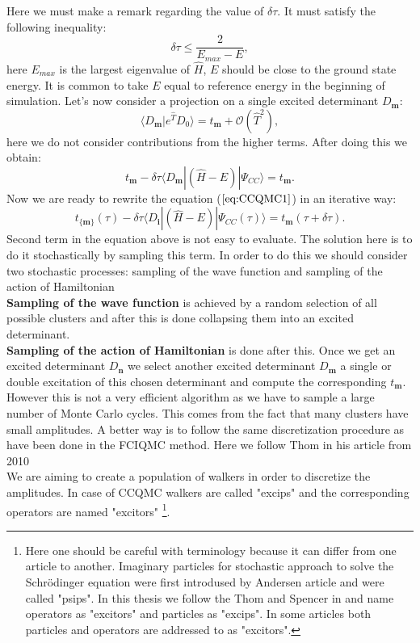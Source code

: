 \documentclass[twoside,english]{uiofysmaster}
\theoremstyle{definition}
\begin{document}
Here we must make a remark regarding the value of $\delta \tau$. It must satisfy the following inequality:
\begin{equation}
\delta \tau \leq \frac{2}{E_{max} - E},
\end{equation}
here $E_{max}$ is the largest eigenvalue of $\hat{H}$, $E$ should be close to the ground state energy. It is common to take $E$ equal to reference energy in the beginning of simulation.
Let's now consider a projection on a single excited determinant $D_{\boldsymbol{m}}$:
\begin{equation}
\langle D_{\boldsymbol{m}}|e^{\hat{T}}D_0\rangle = t_{\boldsymbol{m}} + \mathcal{O}(\hat{T}^2),
\end{equation}
here we  do not consider contributions from the higher terms. After doing this we obtain: 
\begin{equation}\label{CCbf2}
t_{\boldsymbol{m}} - \delta \tau \langle D_{\boldsymbol{m}}|(\hat{H}-E)|\Psi_{CC}\rangle = t_{\boldsymbol{m}}.
\end{equation}
Now we are ready to rewrite the equation ($\ref{eq:CCQMC1}$) in an iterative way:
\begin{equation}\label{eq:CCiter}
 t_{\{\boldsymbol{m}\}}(\tau) - \delta \tau \langle D_{\boldsymbol{i}}|(\hat{H}-E)|\Psi_{CC}(\tau)\rangle = t_{\boldsymbol{m}}(\tau + \delta \tau).
\end{equation}
Second term in the equation above is not easy to evaluate. The solution here is to do it stochastically by sampling this term. In order to do this we should consider two stochastic processes: sampling of the wave function and sampling of the action of Hamiltonian\\
\textbf{Sampling of the wave function} is achieved by a random selection of all possible clusters and after this is done collapsing them into an excited determinant.\\
\textbf{Sampling of the action of Hamiltonian} is done after this. Once we get an excited determinant $D_\textbf{n}$ we select another excited determinant $D_\textbf{m}$ a single or double excitation of this chosen determinant and compute the corresponding $t_\textbf{m}$. However this is not a very efficient algorithm as we have to sample a large number of Monte Carlo cycles. This comes from the fact that many clusters have small amplitudes. A better way is to follow the same discretization procedure as have been done in the FCIQMC method. Here we follow Thom in his article from 2010 \cite{thomStochasticCoupledCluster2010} \\ 
We are aiming to create a population of walkers in order to discretize the amplitudes. In case of CCQMC walkers are called "excips" and the corresponding operators are named "excitors" \footnote{Here one should be careful with terminology because it can differ from one article to another. Imaginary particles for stochastic approach to solve the Schr\"{o}dinger equation were first introdused by Andersen article  \cite{andersonRandomWalkSimulation1975} and were called "psips". In this thesis we follow the Thom and Spencer in \cite{spencerDevelopmentsStochasticCoupled2016}  and name operators as "excitors" and particles as "excips". In some articles both particles and operators are addressed to as "excitors".}.
\end{document}
